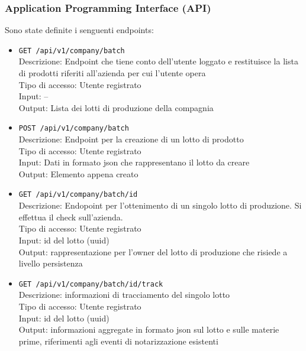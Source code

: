 \documentclass[a4paper,11pt]{article}
\begin{document}
\subsubsection{Application Programming Interface (API)}

Sono state definite i senguenti endpoints:

\begin{itemize}
  \item \texttt{GET /api/v1/company/batch}
        \\ Descrizione: Endpoint che tiene conto dell'utente loggato e restituisce la lista di prodotti riferiti all'azienda per cui l'utente opera
        \\ Tipo di accesso: Utente registrato
        \\ Input: --
        \\ Output: Lista dei lotti di produzione della compagnia

  \item \texttt{POST /api/v1/company/batch}
        \\ Descrizione: Endpoint per la creazione di un lotto di prodotto
        \\ Tipo di accesso: Utente registrato
        \\ Input: Dati in formato json che rappresentano il lotto da creare
        \\ Output: Elemento appena creato

  \item \texttt{GET /api/v1/company/batch/{{id}}}
        \\ Descrizione: Endopoint per l'ottenimento di un singolo lotto di produzione. Si effettua il check sull'azienda.
        \\ Tipo di accesso: Utente registrato
        \\ Input: id del lotto (uuid)
        \\ Output: rappresentazione per l'owner del lotto di produzione che risiede a livello persistenza

  \item \texttt{GET /api/v1/company/batch/{{id}}/track}
        \\ Descrizione: informazioni di tracciamento del singolo lotto
        \\ Tipo di accesso: Utente registrato
        \\ Input: id del lotto (uuid)
        \\ Output: informazioni aggregate in formato json sul lotto e sulle materie prime, riferimenti agli eventi di notarizzazione esistenti


\end{itemize}
\end{document}
